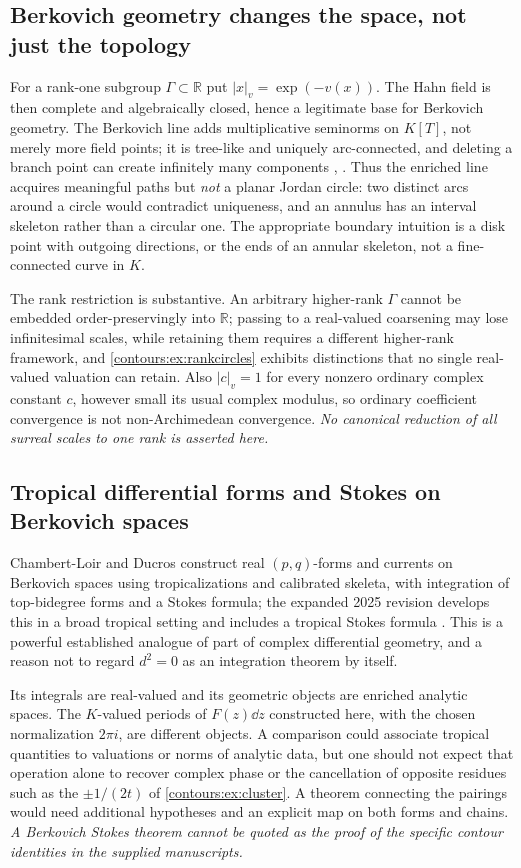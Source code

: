 \documentclass[11pt,letterpaper]{article}
\theoremstyle{definition}
\theoremstyle{remark}
\newcommand{\R}{\mathbb R}\newcommand{\C}{\mathbb C}\newcommand{\Q}{\mathbb Q}
\numberwithin{equation}{section}
\begin{document}
\subsection{Berkovich geometry changes the space, not just the topology}
For a rank-one subgroup $\Gamma\subset\R$ put $|x|_v=\exp(-v(x))$. The Hahn field is
then complete and algebraically closed, hence a legitimate base for Berkovich
geometry. The Berkovich line adds multiplicative seminorms on $K[T]$, not merely
more field points; it is tree-like and uniquely arc-connected, and deleting a branch
point can create infinitely many components \cite[\S2.3.3]{Temkin}, \cite{BR}. Thus
the enriched line acquires meaningful paths but \emph{not} a planar Jordan circle:
two distinct arcs around a circle would contradict uniqueness, and an annulus has an
interval skeleton rather than a circular one. The appropriate boundary intuition is
a disk point with outgoing directions, or the ends of an annular skeleton, not a
fine-connected curve in $K$.

The rank restriction is substantive. An arbitrary higher-rank $\Gamma$ cannot be
embedded order-preservingly into $\R$; passing to a real-valued coarsening may lose
infinitesimal scales, while retaining them requires a different higher-rank
framework, and \cref{contours:ex:rankcircles} exhibits distinctions that no single
real-valued valuation can retain. Also $|c|_v=1$ for every nonzero ordinary complex
constant $c$, however small its usual complex modulus, so ordinary coefficient
convergence is not non-Archimedean convergence. \emph{No canonical reduction of all
surreal scales to one rank is asserted here.}

\subsection{Tropical differential forms and Stokes on Berkovich spaces}
Chambert-Loir and Ducros construct real $(p,q)$-forms and currents on Berkovich
spaces using tropicalizations and calibrated skeleta, with integration of
top-bidegree forms and a Stokes formula; the expanded 2025 revision develops this in
a broad tropical setting and includes a tropical Stokes formula
\cite[Prop.~5.11.1]{CLD}. This is a powerful established analogue of part of complex
differential geometry, and a reason not to regard $d^2=0$ as an integration theorem
by itself.

Its integrals are real-valued and its geometric objects are enriched analytic
spaces. The $K$-valued periods of $F(z)\dd z$ constructed here, with the chosen
normalization $2\pi i$, are different objects. A comparison could associate tropical
quantities to valuations or norms of analytic data, but one should not expect that
operation alone to recover complex phase or the cancellation of opposite residues
such as the $\pm1/(2t)$ of \cref{contours:ex:cluster}. A theorem connecting the
pairings would need additional hypotheses and an explicit map on both forms and
chains. \emph{A Berkovich Stokes theorem cannot be quoted as the proof of the
specific contour identities in the supplied manuscripts.}
\end{document}

